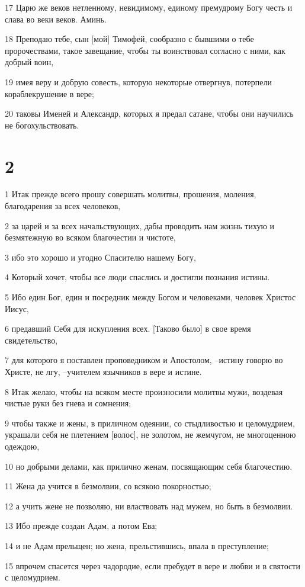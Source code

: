 \par 17 Царю же веков нетленному, невидимому, единому премудрому Богу честь и слава во веки веков. Аминь.
\par 18 Преподаю тебе, сын [мой] Тимофей, сообразно с бывшими о тебе пророчествами, такое завещание, чтобы ты воинствовал согласно с ними, как добрый воин,
\par 19 имея веру и добрую совесть, которую некоторые отвергнув, потерпели кораблекрушение в вере;
\par 20 таковы Именей и Александр, которых я предал сатане, чтобы они научились не богохульствовать.

\chapter{2}

\par 1 Итак прежде всего прошу совершать молитвы, прошения, моления, благодарения за всех человеков,
\par 2 за царей и за всех начальствующих, дабы проводить нам жизнь тихую и безмятежную во всяком благочестии и чистоте,
\par 3 ибо это хорошо и угодно Спасителю нашему Богу,
\par 4 Который хочет, чтобы все люди спаслись и достигли познания истины.
\par 5 Ибо един Бог, един и посредник между Богом и человеками, человек Христос Иисус,
\par 6 предавший Себя для искупления всех. [Таково было] в свое время свидетельство,
\par 7 для которого я поставлен проповедником и Апостолом, --истину говорю во Христе, не лгу, --учителем язычников в вере и истине.
\par 8 Итак желаю, чтобы на всяком месте произносили молитвы мужи, воздевая чистые руки без гнева и сомнения;
\par 9 чтобы также и жены, в приличном одеянии, со стыдливостью и целомудрием, украшали себя не плетением [волос], не золотом, не жемчугом, не многоценною одеждою,
\par 10 но добрыми делами, как прилично женам, посвящающим себя благочестию.
\par 11 Жена да учится в безмолвии, со всякою покорностью;
\par 12 а учить жене не позволяю, ни властвовать над мужем, но быть в безмолвии.
\par 13 Ибо прежде создан Адам, а потом Ева;
\par 14 и не Адам прельщен; но жена, прельстившись, впала в преступление;
\par 15 впрочем спасется через чадородие, если пребудет в вере и любви и в святости с целомудрием.

